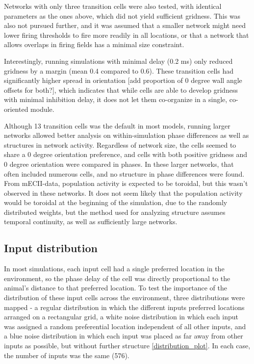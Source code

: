 \documentclass{article}
\begin{document}
    Networks with only three transition cells were also tested, with identical parameters as the ones above, which did not yield sufficient gridness. This was also not pursued further, and it was assumed that a smaller network might need lower firing thresholds to fire more readily in all locations, or that a network that allows overlaps in firing fields has a minimal size constraint.
    
    Interestingly, running simulations with minimal delay (0.2 ms) only reduced gridness by a margin (mean 0.4 compared to 0.6). These transition cells had significantly higher spread in orientation [add proportion of 0 degree wall angle offsets for both?], which indicates that while cells are able to develop gridness with minimal inhibition delay, it does not let them co-organize in a single, co-oriented module.

    Although 13 transition cells was the default in most models, running larger networks allowed better analysis on within-simulation phase differences as well as structures in network activity. Regardless of network size, the cells seemed to share a 0 degree orientation preference, and cells with both positive gridness and 0 degree orientation were compared in phases. In these larger networks, that often included numerous cells, and no structure in phase differences were found. From mECII-data, population activity is expected to be toroidal, but this wasn't observed in these networks. It does not seem likely that the population activity would be toroidal at the beginning of the simulation, due to the randomly distributed weights, but the method used for analyzing structure assumes temporal continuity, as well as sufficiently large networks.

    \subsection{Input distribution}
    In most simulations, each input cell had a single preferred location in the environment, so the phase delay of the cell was directly proportional to the animal's distance to that preferred location. To test the importance of the distribution of these input cells across the environment, three distributions were mapped - a regular distribution in which the different inputs preferred locations arranged on a rectangular grid, a white noise distribution in which each input was assigned a random preferential location independent of all other inputs, and a blue noise distribution in which each input was placed as far away from other inputs as possible, but without further structure \ref{distribution_plot}. In each case, the number of inputs was the same (576).
\end{document}
